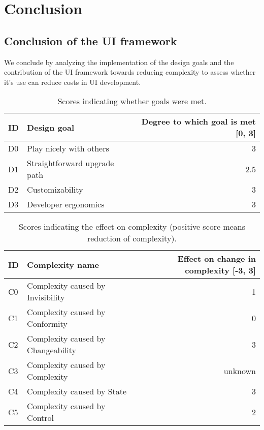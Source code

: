 \section{Conclusion}\label{conclusion}

\subsection{Conclusion of the UI framework}
We conclude by analyzing the implementation of the design goals and the contribution of the UI framework towards reducing complexity to assess whether it's use can reduce costs in UI development.

\begin{table}[]
  \begin{center}
    \begin{tabular}{|l|l|r|}
      \hline
      ID & Design goal & Degree to which goal is met [0, 3] \\
      \hline
      D0 & Play nicely with others & 3 \\
      D1 & Straightforward upgrade path & 2.5 \\
      D2 & Customizability & 3 \\
      D3 & Developer ergonomics & 3 \\
      \hline
    \end{tabular}
    \caption{Scores indicating whether goals were met.}
  \end{center}
\end{table}

\begin{table}[]
  \begin{center}
    \begin{tabular}{|l|l|r|}
      \hline
      ID & Complexity name & Effect on change in complexity [-3, 3] \\
      \hline
      C0 & Complexity caused by Invisibility & 1 \\
      C1 & Complexity caused by Conformity & 0 \\
      C2 & Complexity caused by Changeability & 3 \\
      C3 & Complexity caused by Complexity & unknown \\
      C4 & Complexity caused by State & 3 \\
      C5 & Complexity caused by Control & 2 \\
      \hline
    \end{tabular}
    \caption{Scores indicating the effect on complexity (positive score means reduction of complexity).}
    \label{tab:summarycomplexity}
  \end{center}
\end{table}

